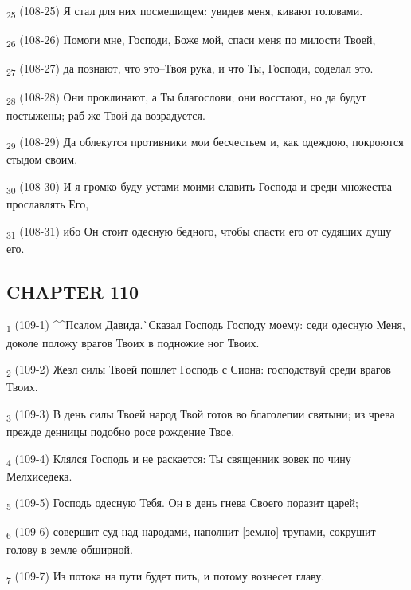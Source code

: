 \begin{tcolorbox}
\textsubscript{25} (108-25) Я стал для них посмешищем: увидев меня, кивают головами.
\end{tcolorbox}
\begin{tcolorbox}
\textsubscript{26} (108-26) Помоги мне, Господи, Боже мой, спаси меня по милости Твоей,
\end{tcolorbox}
\begin{tcolorbox}
\textsubscript{27} (108-27) да познают, что это--Твоя рука, и что Ты, Господи, соделал это.
\end{tcolorbox}
\begin{tcolorbox}
\textsubscript{28} (108-28) Они проклинают, а Ты благослови; они восстают, но да будут постыжены; раб же Твой да возрадуется.
\end{tcolorbox}
\begin{tcolorbox}
\textsubscript{29} (108-29) Да облекутся противники мои бесчестьем и, как одеждою, покроются стыдом своим.
\end{tcolorbox}
\begin{tcolorbox}
\textsubscript{30} (108-30) И я громко буду устами моими славить Господа и среди множества прославлять Его,
\end{tcolorbox}
\begin{tcolorbox}
\textsubscript{31} (108-31) ибо Он стоит одесную бедного, чтобы спасти его от судящих душу его.
\end{tcolorbox}
\subsection{CHAPTER 110}
\begin{tcolorbox}
\textsubscript{1} (109-1) ^^Псалом Давида.^^ Сказал Господь Господу моему: седи одесную Меня, доколе положу врагов Твоих в подножие ног Твоих.
\end{tcolorbox}
\begin{tcolorbox}
\textsubscript{2} (109-2) Жезл силы Твоей пошлет Господь с Сиона: господствуй среди врагов Твоих.
\end{tcolorbox}
\begin{tcolorbox}
\textsubscript{3} (109-3) В день силы Твоей народ Твой готов во благолепии святыни; из чрева прежде денницы подобно росе рождение Твое.
\end{tcolorbox}
\begin{tcolorbox}
\textsubscript{4} (109-4) Клялся Господь и не раскается: Ты священник вовек по чину Мелхиседека.
\end{tcolorbox}
\begin{tcolorbox}
\textsubscript{5} (109-5) Господь одесную Тебя. Он в день гнева Своего поразит царей;
\end{tcolorbox}
\begin{tcolorbox}
\textsubscript{6} (109-6) совершит суд над народами, наполнит [землю] трупами, сокрушит голову в земле обширной.
\end{tcolorbox}
\begin{tcolorbox}
\textsubscript{7} (109-7) Из потока на пути будет пить, и потому вознесет главу.
\end{tcolorbox}

